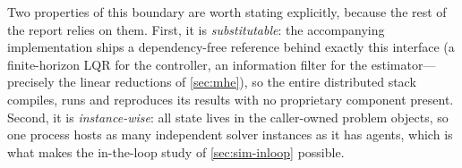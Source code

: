 Two properties of this boundary are worth stating explicitly, because the rest of
the report relies on them. First, it is \emph{substitutable}: the accompanying
implementation ships a dependency-free reference behind exactly this interface
(a finite-horizon LQR for the controller, an information filter for the
estimator---precisely the linear reductions of \cref{sec:mhe}), so the entire
distributed stack compiles, runs and reproduces its results with no proprietary
component present. Second, it is \emph{instance-wise}: all state lives in the
caller-owned problem objects, so one process hosts as many independent solver
instances as it has agents, which is what makes the in-the-loop study of
\cref{sec:sim-inloop} possible.
